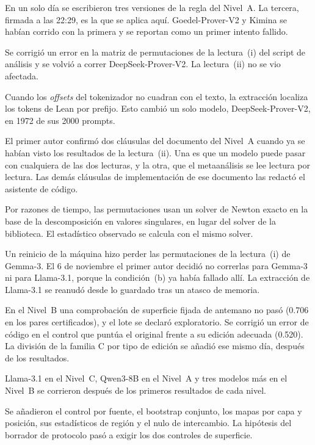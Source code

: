\documentclass[10pt]{article}
\begin{document}
\begin{description}[leftmargin=1.2em]
\item[4 nov] En un solo día se escribieron tres versiones de la regla del Nivel~A. La tercera, firmada a las 22:29,
es la que se aplica aquí. Goedel-Prover-V2 y Kimina se habían corrido con la primera y se reportan como un primer
intento fallido.
\item[5 nov, 08:37] Se corrigió un error en la matriz de permutaciones de la lectura~(i) del script de análisis y
se volvió a correr DeepSeek-Prover-V2. La lectura~(ii) no se vio afectada.
\item[5 nov] Cuando los \emph{offsets} del tokenizador no cuadran con el texto, la extracción localiza los tokens
de Lean por prefijo. Esto cambió un solo modelo, DeepSeek-Prover-V2, en 1972 de sus 2000 prompts.
\item[5 nov] El primer autor confirmó dos cláusulas del documento del Nivel~A cuando ya se habían visto los
resultados de la lectura~(ii). Una es que un modelo puede pasar con cualquiera de las dos lecturas, y la otra, que
el metaanálisis se lee lectura por lectura. Las demás cláusulas de implementación de ese documento las redactó el
asistente de código.
\item[5 nov] Por razones de tiempo, las permutaciones usan un solver de Newton exacto en la base de la
descomposición en valores singulares, en lugar del solver de la biblioteca. El estadístico observado se calcula con
el mismo solver.
\item[5--6 nov] Un reinicio de la máquina hizo perder las permutaciones de la lectura~(i) de Gemma-3. El 6 de
noviembre el primer autor decidió no correrlas para Gemma-3 ni para Llama-3.1, porque la condición~(b) ya había
fallado allí. La extracción de Llama-3.1 se reanudó desde lo guardado tras un atasco de memoria.
\item[6 nov] En el Nivel~B una comprobación de superficie fijada de antemano no pasó (0.706 en los pares
certificados), y el lote se declaró exploratorio. Se corrigió un error de código en el control que puntúa el
original frente a su edición adecuada (0.520). La división de la familia C por tipo de edición se añadió ese mismo
día, después de los resultados.
\item[7--8 nov] Llama-3.1 en el Nivel~C, Qwen3-8B en el Nivel~A y tres modelos más en el Nivel~B se corrieron
después de los primeros resultados de cada nivel.
\item[9 nov] Se añadieron el control por fuente, el bootstrap conjunto, los mapas por capa y posición, sus
estadísticos de región y el nulo de intercambio. La hipótesis del borrador de protocolo pasó a exigir los dos
controles de superficie.
\end{description}
\end{document}
